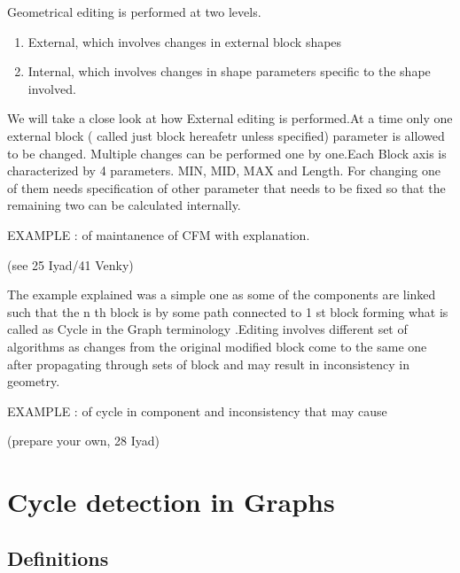 		Geometrical editing is performed at two levels.

		\begin{enumerate}

		\item
		External, which involves changes in external block shapes
		\item
		Internal, which involves changes in shape parameters specific to
			the shape involved.

		\end{enumerate}

		We will take a close look at how External editing is performed.At a
	time only one external block ( called just block hereafetr unless specified)	parameter is allowed to be changed. Multiple changes can be performed one 
	by one.Each Block axis is characterized by 4 parameters. MIN, MID, MAX and 
	Length.
	For changing one of them needs specification of other parameter that needs
	to be fixed so that the remaining two can be calculated internally.

	EXAMPLE : of maintanence of CFM with explanation.












	(see 25 Iyad/41 Venky)

	The example explained was a simple one as some of the components are
	linked such that the n th block is by some path connected to 1 st block
	forming what is called as Cycle in the Graph terminology .Editing involves 
	different set of algorithms as changes from the original modified block
	come to the same one after propagating through sets of block and may
	result in inconsistency in geometry.	

	EXAMPLE : of cycle in component and inconsistency that may cause








	(prepare your own, 28 Iyad)

	\section{Cycle detection in Graphs}

    \subsection{Definitions}

